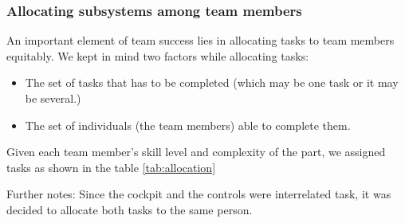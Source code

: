 \subsubsection{Allocating subsystems among team members}

An important element of team success lies in allocating tasks to team members equitably. We kept in mind two factors while allocating tasks:
\begin{itemize}
  \item The set of tasks that has to be completed (which may be one task or it may be several.)
  \item The set of individuals (the team members) able to complete them.
\end{itemize}

Given each team member's skill level and complexity of the part, we assigned tasks as shown in the table \ref{tab:allocation}

Further notes:
Since the cockpit and the controls were interrelated task, it was decided to allocate both tasks to the same person.

